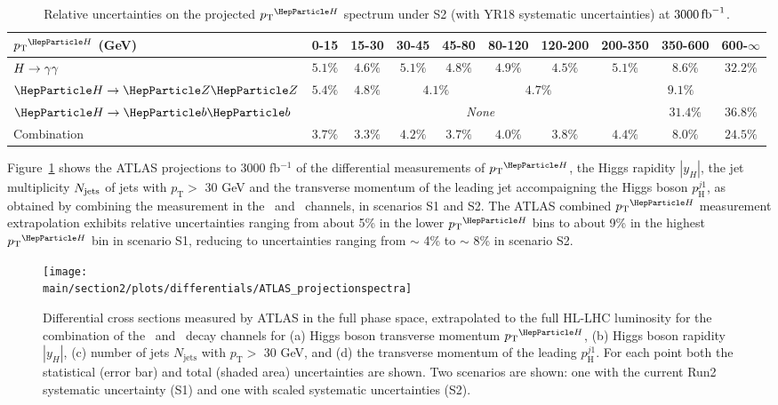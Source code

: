 \begin{table}%
\footnotesize
\begin{center}
\begin{tabular}{l|c|c|c|c|c|c|c|c|c}
$\pTH$ (GeV)       & 0-15    &  15-30   &  30-45    &  45-80   &  80-120  &  120-200  &  200-350  &  350-600  &  600-$\infty$  \\
\hline
$H\rightarrow\gamma\gamma$       & $5.1\%$ & $4.6\%$ & $5.1\%$ & $4.8\%$            & $4.9\%$ & $4.5\%$            & $5.1\%$ & $8.6\%$  & $32.2\%$ \\ 
$\hzz$       & $5.4\%$ & $4.8\%$ & \multicolumn{2}{c|}{$4.1\%$} & \multicolumn{2}{c|}{$4.7\%$} & \multicolumn{3}{c}{$9.1\%$} \\ 
$\hbb$       & \multicolumn{7}{c|}{\textit{None}}                                              & $31.4\%$ & $36.8\%$ \\ 
Combination  & $3.7\%$ & $3.3\%$ & $4.2\%$ & $3.7\%$            & $4.0\%$ & $3.8\%$            & $4.4\%$ & $8.0\%$  & $24.5\%$ \\
\end{tabular}
\end{center}
\caption{
    Relative uncertainties on the projected $\pTH$ spectrum under S2 (with YR18 systematic uncertainties) at $3000\mbox{\ensuremath{\,\text{fb}^\text{$-$1}}}$.
    }
\label{tab:proj_pth_unc_scen2}
\end{table}

Figure~\ref{fig:ATLAS_proj_differential} shows the ATLAS projections to 3000 fb$^{-1}$ of the differential measurements of $\pTH$, the Higgs rapidity $|y_H|$, the jet multiplicity $N_{\rm jets}$ of jets with $p_{\mathrm{T}} >$ 30 GeV and the transverse momentum of the leading jet accompaigning the Higgs boson $p_{\mathrm{H}}^{j1}$, as obtained by combining the measurement in the \Hyy\ and \HZZ\ channels, in scenarios S1 and S2. The ATLAS combined $\pTH$ measurement extrapolation exhibits relative uncertainties ranging from about 5\% in the lower $\pTH$ bins to about 9\% in the highest $\pTH$ bin in scenario S1, reducing to uncertainties ranging from $\sim$ 4\% to $\sim$ 8\% in scenario S2.

\begin{figure}
  \centering
  \texttt{[image: \\main/section2/plots/differentials/ATLAS\_projectionspectra]}
  \caption{Differential cross sections measured by ATLAS in the full phase space, extrapolated to the full HL-LHC luminosity for the combination of the \Hyy\ and \HZZ\ decay channels for (a) Higgs boson transverse momentum $\pTH$, (b) Higgs boson rapidity $|y_H|$, (c) number of jets $N_{\mathrm{jets}}$ with  $p_{\mathrm{T}} >$ 30 GeV, and (d) the transverse momentum of the leading $p_{\mathrm{H}}^{j1}$. For each point both the statistical (error bar) and total (shaded area) uncertainties are shown. Two scenarios are shown: one with the current Run2 systematic uncertainty (S1) and one with scaled systematic uncertainties (S2).}
   \label{fig:ATLAS_proj_differential}
\end{figure}


